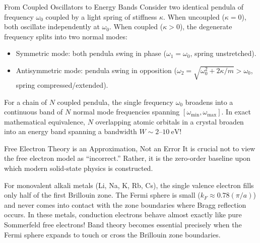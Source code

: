 \documentclass[11pt,a4paper]{article}
\begin{document}
\begin{checkpointbox}{From Coupled Oscillators to Energy Bands}
Consider two identical pendula of frequency $\omega_0$ coupled by a light spring of stiffness $\kappa$. When uncoupled ($\kappa = 0$), both oscillate independently at $\omega_0$. When coupled ($\kappa > 0$), the degenerate frequency splits into two normal modes:
\begin{itemize}
    \item Symmetric mode: both pendula swing in phase ($\omega_1 = \omega_0$, spring unstretched).
    \item Antisymmetric mode: pendula swing in opposition ($\omega_2 = \sqrt{\omega_0^2 + 2\kappa/m} > \omega_0$, spring compressed/extended).
\end{itemize}
For a chain of $N$ coupled pendula, the single frequency $\omega_0$ broadens into a continuous band of $N$ normal mode frequencies spanning $[\omega_{\mathrm{min}}, \omega_{\mathrm{max}}]$. In exact mathematical equivalence, $N$ overlapping atomic orbitals in a crystal broaden into an energy band spanning a bandwidth $W \sim 2\text{--}10\ \mathrm{eV}$!
\end{checkpointbox}

\begin{pitfallbox}{Free Electron Theory is an Approximation, Not an Error}
It is crucial not to view the free electron model as ``incorrect.'' Rather, it is the zero-order baseline upon which modern solid-state physics is constructed. 

For monovalent alkali metals (Li, Na, K, Rb, Cs), the single valence electron fills only half of the first Brillouin zone. The Fermi sphere is small ($k_F \approx 0.78(\pi/a)$) and never comes into contact with the zone boundaries where Bragg reflection occurs. In these metals, conduction electrons behave almost exactly like pure Sommerfeld free electrons! Band theory becomes essential precisely when the Fermi sphere expands to touch or cross the Brillouin zone boundaries.
\end{pitfallbox}

\vspace{0.4cm}
\end{document}
